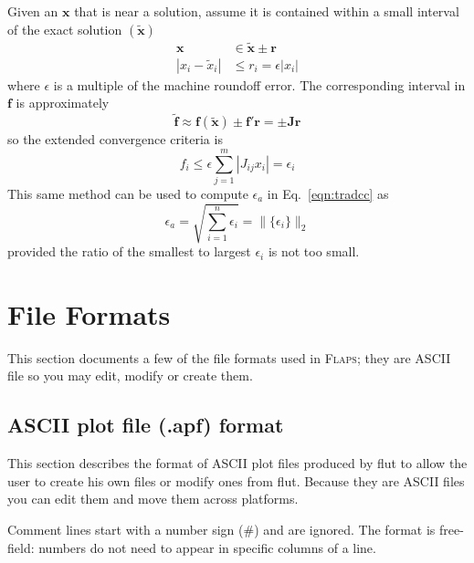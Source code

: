 \documentclass[10pt,openany,twoside]{book}
\numberwithin{equation}{section}   %
\newcommand{\Cmd}[1]{{\sf #1}}
\newcommand{\Matrix}[1]{\boldsymbol{#1}}
\newcommand{\Vector}[1]{\boldsymbol{#1}}
\newcommand{\Flaps}{{\normalfont\scshape Flaps\:}}
\newcommand{\Eqn}[1]{Eq.\ \ref{#1}}
\begin{document}
Given an $\Vector{x}$ that is near a solution, assume it is contained
within a small interval of the exact
solution $(\Vector{\tilde{x}})$
\begin{align}
\Vector{x} &\in \tilde{\Vector{x}} \pm \Vector{r} \nonumber \\
|x_i - \tilde{x}_i| &\le r_i = \epsilon |x_i|
\end{align}
where $\epsilon$ is a multiple of the machine roundoff error.
The corresponding interval in $\Vector{f}$ is approximately
\begin{equation}
\Vector{\tilde{f}} \approx \Vector{f(\tilde{x})} \pm \Vector{f}' \Vector{r}
	= \pm \Matrix{J}\Vector{r}
\end{equation}
so the extended convergence criteria is
\begin{equation}
f_i \le \epsilon \sum_{j=1}^{m} |J_{ij} x_i| = \epsilon_i
\end{equation}
This same method can be used to compute $\epsilon_a$ in \Eqn{eqn:tradcc} as
\begin{equation}
\epsilon_a = \sqrt{\sum_{i=1}^{n} \epsilon_i} = \|\{\epsilon_i\}\|_2
\end{equation}
provided the ratio of the smallest to largest $\epsilon_i$ is not too small.


\section{File Formats}
This section documents a few of the file formats used in \Flaps; they
are ASCII file so you may edit, modify or create them.

\subsection{ASCII plot file (.apf) format}\label{sect:apf-file}
This section describes the format of ASCII plot files produced by
\Cmd{flut} to allow the user to create his own files or modify ones
from \Cmd{flut}.
Because they are ASCII files
you can edit them and move them across platforms.

Comment lines start with a number sign (\#) and
are ignored.
The format is free-field: numbers do not need to
appear in specific columns of a line.
\end{document}
